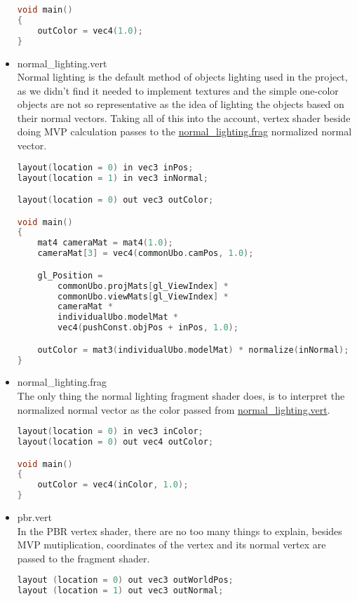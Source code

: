 \begin{itemize}
\begin{lstlisting}[language=c++, caption=Light cube fragment shader(./assets/shaders/light\_cube.frag)]
void main()
{
    outColor = vec4(1.0);
}
\end{lstlisting}
    \item normal\_lighting.vert\\
    \label{vert_normal_light}
    Normal lighting is the default method of objects lighting used in the project, as we didn't find it needed to implement textures and the simple one-color objects are not so representative as the idea of lighting the objects based on their normal vectors. Taking all of this into the account, vertex shader beside doing MVP calculation passes to the \hyperref[frag_normal_light]{normal\_lighting.frag} normalized normal vector.
\begin{lstlisting}[language=c++, caption=Normal lighting vertex shader(./assets/shaders/normal\_lighting.vert)]
layout(location = 0) in vec3 inPos;
layout(location = 1) in vec3 inNormal;

layout(location = 0) out vec3 outColor;

void main()
{
    mat4 cameraMat = mat4(1.0);
    cameraMat[3] = vec4(commonUbo.camPos, 1.0);

    gl_Position =
        commonUbo.projMats[gl_ViewIndex] *
        commonUbo.viewMats[gl_ViewIndex] *
        cameraMat *
        individualUbo.modelMat *
        vec4(pushConst.objPos + inPos, 1.0);

    outColor = mat3(individualUbo.modelMat) * normalize(inNormal);
}
\end{lstlisting}
    \item normal\_lighting.frag\\
    The only thing the normal lighting fragment shader does, is to interpret the normalized normal vector as the color passed from \hyperref[vert_normal_light]{normal\_lighting.vert}.
    \label{frag_normal_light}
\begin{lstlisting}[language=c++, caption=Normal lighting fragment shader(./assets/shaders/normal\_lighting.frag)]
layout(location = 0) in vec3 inColor;
layout(location = 0) out vec4 outColor;

void main()
{
    outColor = vec4(inColor, 1.0);
}
\end{lstlisting}
    \item pbr.vert\\
    In the PBR vertex shader, there are no too many things to explain, besides MVP mutiplication, coordinates of the vertex and its normal vertex are passed to the fragment shader. 
\begin{lstlisting}[language=c++, caption=PBR vertex shader(./assets/shaders/pbr.vert)]
layout (location = 0) out vec3 outWorldPos;
layout (location = 1) out vec3 outNormal;


\end{lstlisting}
\end{itemize}
